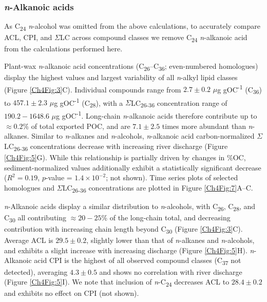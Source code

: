 \subsubsection{\textit{n}-Alkanoic acids}

As C\textsubscript{24} \textit{n}-alcohol was omitted from the above calculations, to accurately compare ACL, CPI, and $\Sigma$LC across compound classes we remove C\textsubscript{24} \textit{n}-alkanoic acid from the calculations performed here.

Plant-wax \textit{n}-alkanoic acid concentrations (C\textsubscript{26}--C\textsubscript{36}; even-numbered homologues) display the highest values and largest variability of all \textit{n}-alkyl lipid classes (Figure \ref{Ch4Fig:3}C). Individual compounds range from $2.7 \pm 0.2$ $\mu$g gOC\textsuperscript{-1} (C\textsubscript{36}) to $457.1 \pm 2.3$ $\mu$g gOC\textsuperscript{-1} (C\textsubscript{28}), with a $\Sigma$LC\textsubscript{26-36} concentration range of $190.2 - 1648.6$ $\mu$g gOC\textsuperscript{-1}. Long-chain \textit{n}-alkanoic acids therefore contribute up to $\approx 0.2$\% of total exported POC, and are $7.1 \pm 2.5$ times more abundant than \textit{n}-alkanes. Similar to \textit{n}-alkanes and \textit{n}-alcohols, \textit{n}-alkanoic acid carbon-normalized $\Sigma$LC\textsubscript{26-36} concentrations decrease with increasing river discharge (Figure \ref{Ch4Fig:5}G). While this relationship is partially driven by changes in \%OC, sediment-normalized values additionally exhibit a statistically significant decrease ($R^2 = 0.19$, $p$-value = $1.4 \times 10^{-2}$; not shown). Time series plots of selected homologues and $\Sigma$LC\textsubscript{26-36} concentrations are plotted in Figure \ref{Ch4Fig:7}A--C.

\textit{n}-Alkanoic acids display a similar distribution to \textit{n}-alcohols, with C\textsubscript{26}, C\textsubscript{28}, and C\textsubscript{30} all contributing $\approx 20 - 25$\% of the long-chain total, and decreasing contribution with increasing chain length beyond C\textsubscript{30} (Figure \ref{Ch4Fig:3}C). Average ACL is $29.5 \pm 0.2$, slightly lower than that of \textit{n}-alkanes and \textit{n}-alcohols, and exhibits a slight increase with increasing discharge (Figure \ref{Ch4Fig:5}H). \textit{n}-Alkanoic acid CPI is the highest of all observed compound classes (C\textsubscript{37} not detected), averaging $4.3 \pm 0.5$ and shows no correlation with river discharge (Figure \ref{Ch4Fig:5}I). We note that inclusion of \textit{n}-C\textsubscript{24} decreases ACL to $28.4 \pm 0.2$ and exhibits no effect on CPI (not shown).

